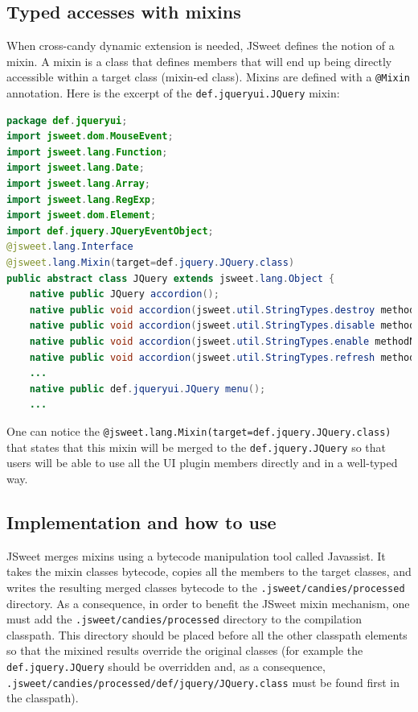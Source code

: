 \documentclass[a4paper]{report}
\begin{document}
\subsection{Typed accesses with mixins}

When cross-candy dynamic extension is needed, JSweet defines the notion of a mixin. A mixin is a class that defines members that will end up being directly accessible within a target class (mixin-ed class). Mixins are defined with a \texttt{@Mixin} annotation. Here is the excerpt of the \texttt{def.jqueryui.JQuery} mixin:

\begin{lstlisting}[language=Java]
package def.jqueryui;
import jsweet.dom.MouseEvent;
import jsweet.lang.Function;
import jsweet.lang.Date;
import jsweet.lang.Array;
import jsweet.lang.RegExp;
import jsweet.dom.Element;
import def.jquery.JQueryEventObject;
@jsweet.lang.Interface
@jsweet.lang.Mixin(target=def.jquery.JQuery.class)
public abstract class JQuery extends jsweet.lang.Object {
    native public JQuery accordion();
    native public void accordion(jsweet.util.StringTypes.destroy methodName);
    native public void accordion(jsweet.util.StringTypes.disable methodName);
    native public void accordion(jsweet.util.StringTypes.enable methodName);
    native public void accordion(jsweet.util.StringTypes.refresh methodName);
    ...
    native public def.jqueryui.JQuery menu();
    ...
\end{lstlisting}

One can notice the \texttt{@jsweet.lang.Mixin(target=def.jquery.JQuery.class)} that states that this mixin will be merged to the \texttt{def.jquery.JQuery} so that users will be able to use all the UI plugin members directly and in a well-typed way.

\subsection{Implementation and how to use}

JSweet merges mixins using a bytecode manipulation tool called Javassist. It takes the mixin classes bytecode, copies all the members to the target classes, and writes the resulting merged classes bytecode to the \texttt{.jsweet/candies/processed} directory. As a consequence, in order to benefit the JSweet mixin mechanism, one must add the \texttt{.jsweet/candies/processed} directory to the compilation classpath. This directory should be placed before all the other classpath elements so that the mixined results override the original classes (for example the \texttt{def.jquery.JQuery} should be overridden and, as a consequence, \texttt{.jsweet/candies/processed/def/jquery/JQuery.class} must be found first in the classpath).
\end{document}
